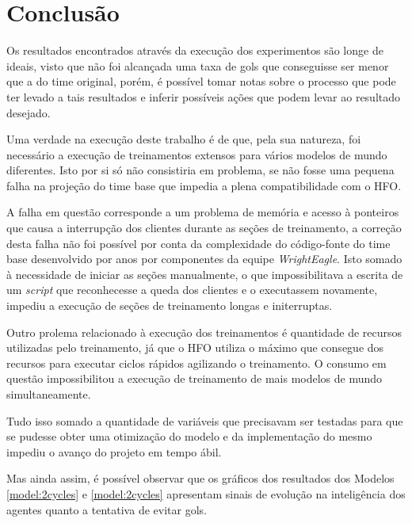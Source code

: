 \chapter{Conclusão}\label{sec:conclusion}

Os resultados encontrados através da execução dos experimentos são longe de
ideais, visto que não foi alcançada uma taxa de gols que conseguisse ser menor
que a do time original, porém, é possível tomar notas sobre o processo que pode
ter levado a tais resultados e inferir possíveis ações que podem levar ao
resultado desejado.

Uma verdade na execução deste trabalho é de que,
pela sua natureza, foi necessário a execução de treinamentos extensos para
vários modelos de mundo diferentes. Isto por si só não consistiria em problema, se não
fosse uma pequena falha na projeção do time base que impedia a plena
compatibilidade com o HFO.

A falha em questão corresponde a um problema de memória e acesso à ponteiros que
causa a interrupção dos clientes durante as seções de treinamento, a correção
desta falha não foi possível por conta da complexidade do código-fonte do time
base desenvolvido por anos por componentes da equipe \textit{WrightEagle}. Isto
somado à necessidade de iniciar as seções manualmente, o que impossibilitava a
escrita de um \textit{script} que reconhecesse a queda dos clientes e o
executassem novamente, impediu a execução de seções de treinamento longas e
initerruptas.

Outro prolema relacionado à execução dos treinamentos é quantidade de recursos
utilizadas pelo treinamento, já que o HFO utiliza o máximo que consegue dos
recursos para executar ciclos rápidos agilizando o treinamento. O consumo em
questão impossibilitou a execução de treinamento de mais modelos de mundo
simultaneamente.

Tudo isso somado a quantidade de variáveis que precisavam ser testadas para que
se pudesse obter uma otimização do modelo e da implementação do mesmo impediu o
avanço do projeto em tempo ábil.

Mas ainda assim, é possível observar que os gráficos dos resultados dos Modelos
\ref{model:2cycles} e \ref{model:2cycles} apresentam sinais de evolução na
inteligência dos agentes quanto a tentativa de evitar gols.

